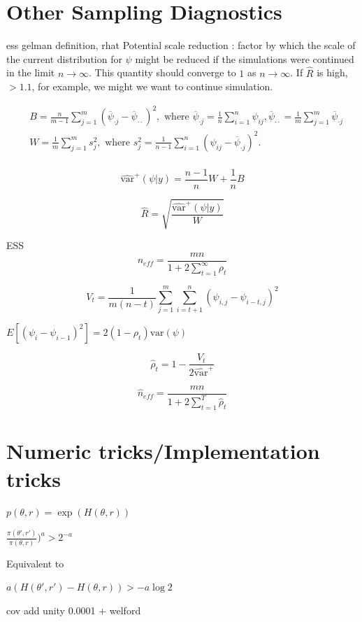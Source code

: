 \documentclass[]{report}
\begin{document}
 
\section{Other Sampling Diagnostics}
ess gelman definition, rhat 
Potential scale reduction : factor by which the scale of the current distribution for $\psi$ might be reduced if the simulations were continued in the limit $n \rightarrow \infty$. This quantity should converge to $1$ as $n \rightarrow \infty$. If $\hat{R}$ is high, $ > 1.1 $, for example, we might we want to continue simulation. 

\begin{align*}
&B = \frac{n}{m-1} \sum_{j=1}^{m}(\overline{\psi}_{\cdot j} - \overline{\psi}_{\cdot \cdot})^2, \text{ where } 
\overline{\psi}_{\cdot j} = \frac{1}{n} \sum_{i=1}^n \psi_{ij} , \overline{\psi}_{\cdot \cdot} = \frac{1}{m} \sum_{j=1}^m \overline{\psi}_{\cdot j }
 \\
&W = \frac{1}{m} \sum_{j=1}^m s_j^2 , \text{ where }
s_j^2 = \frac{1}{n-1} \sum_{i=1}^n (\psi_{ij} - \overline{\psi}_{\cdot j } )^2.\\
\end{align*}

\[ \hat{\text{var}}^+(\psi|y) = \frac{n-1}{n} W + \frac{1}{n} B \]

\[\hat{R} = \sqrt{\frac{\hat{\text{var}}^+(\psi|y)}{W}} \]

ESS 
\[n_{eff}  = \frac{mn}{1 + 2 \sum_{t=1}^\infty \rho_t} \]

\[V_t = \frac{1}{m(n-t)} \sum_{j=1}^m \sum_{i=t+1}^n (\psi_{i,j} - \psi_{i-t,j})^2 \]

$E[(\psi_i - \psi_{i-1})^2] = 2(1-\rho_t)\text{var}(\psi)$

\[\hat{\rho}_t = 1 - \frac{V_t}{2 \hat{\text{var}}^+}\]


\[\hat{n}_{eff} = \frac{mn}{1 + 2 \sum_{t=1}^T \hat{\rho}_t} \]
 


\section{Numeric tricks/Implementation tricks}

$p(\theta,r)  = \exp(H(\theta,r)) $

$\frac{\pi(\theta',r')}{\pi(\theta,r)} )^a > 2^{-a} $

Equivalent to 

$ a (H(\theta',r') - H(\theta,r) ) > -a \log 2 $ 

cov add unity 0.0001 + welford
\end{document}
